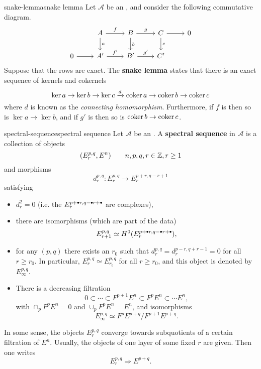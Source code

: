 \begin{topic}{snake-lemma}{snake lemma}
    Let $\mathcal{A}$ be an , and consider the following commutative diagram.
    \[ \begin{tikzcd} & A \arrow{d}{a} \arrow{r}{f} & B \arrow{d}{b} \arrow{r}{g} & C \arrow{d}{c} \arrow{r} & 0 \\ 0 \arrow{r} & A' \arrow{r}{f'} & B' \arrow{r}{g'} & C' \end{tikzcd} \]
    Suppose that the rows are exact. The \textbf{snake lemma} states that there is an exact sequence of kernels and cokernels
    \[ \ker a \rightarrow \ker b \rightarrow \ker c \xrightarrow{d} \operatorname{coker} a \rightarrow \operatorname{coker} b \rightarrow \operatorname{coker} c \]
    where $d$ is known as the \textit{connecting homomorphism}. Furthermore, if $f$ is  then so is $\ker a \to \ker b$, and if $g'$ is  then so is $\operatorname{coker} b \to \operatorname{coker} c$.
\end{topic}

\begin{topic}{spectral-sequence}{spectral sequence}
    Let $\mathcal{A}$ be an . A \textbf{spectral sequence} in $\mathcal{A}$ is a collection of objects
    \[ (E_r^{p, q}, E^n) \qquad n, p, q, r \in \mathbb{Z}, r \ge 1 \]
    and morphisms
    \[ d_r^{p, q} : E_r^{p, q} \to E_r^{p + r, q - r + 1} \]
    satisfying
    \begin{itemize}
        \item $d_r^2 = 0$ (i.e. the $E_r^{p + \bdot r, q - \bdot r + \bdot}$ are complexes),
        \item there are isomorphisms (which are part of the data)
        \[ E_{r + 1}^{p, q} \simeq H^0(E_r^{p + \bdot r, q - \bdot r + \bdot}), \]
        \item for any $(p, q)$ there exists an $r_0$ such that $d_r^{p, q} = d_r^{p - r, q + r - 1} = 0$ for all $r \ge r_0$. In particular, $E_r^{p, q} \simeq E_{r_0}^{p, q}$ for all $r \ge r_0$, and this object is denoted by $E_\infty^{p, q}$.
        \item There is a decreasing filtration
        \[ 0 \subset \cdots \subset F^{p + 1} E^n \subset F^p E^n \subset \cdots E^n , \]
        with $\cap_p F^p E^n = 0$ and $\cup_p F^p E^n = E^n$, and isomorphisms
        \[ E_\infty^{p, q} \simeq F^p E^{p + q} / F^{p + 1} E^{p + q} . \]
    \end{itemize}
    
    In some sense, the objects $E_r^{p, q}$ converge towards subquotients of a certain filtration of $E^n$. Usually, the objects of one layer of some fixed $r$ are given. Then one writes
    \[ E_r^{p, q} \Rightarrow E^{p + q} . \]
\end{topic}

